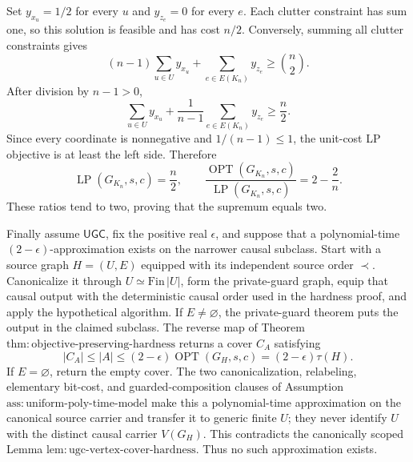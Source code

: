 Set \(y_{x_u}=1/2\) for every \(u\) and \(y_{z_e}=0\) for every \(e\).
Each clutter constraint has sum one, so this solution is feasible and has
cost \(n/2\).  Conversely, summing all clutter constraints gives
\[
 (n-1)\sum_{u\in U}y_{x_u}+\sum_{e\in E(K_n)}y_{z_e}
 \geq\binom n2.
\]
After division by \(n-1>0\),
\[
 \sum_{u\in U}y_{x_u}
 +\frac1{n-1}\sum_{e\in E(K_n)}y_{z_e}\geq\frac n2.
\]
Since every coordinate is nonnegative and \(1/(n-1)\leq1\), the unit-cost
LP objective is at least the left side.  Therefore
\[
 \operatorname{LP}(G_{K_n},s,c)=\frac n2,
 \qquad
 \frac{\operatorname{OPT}(G_{K_n},s,c)}
      {\operatorname{LP}(G_{K_n},s,c)}
 =2-\frac2n.
\]
These ratios tend to two, proving that the supremum equals two.

Finally assume \(\mathsf{UGC}\), fix the positive real
\(\epsilon\), and suppose that a polynomial-time
\((2-\epsilon)\)-approximation exists on the narrower causal subclass.
Start with a source graph \(H=(U,E)\) equipped with its independent source
order \(\prec\).  Canonicalize it through
\(U\simeq\mathrm{Fin}\,|U|\), form the private-guard graph, equip that
causal output with the deterministic causal order used in the hardness
proof, and apply the hypothetical algorithm.  If \(E\neq\varnothing\),
the private-guard theorem puts the output in the claimed subclass.  The
reverse map of Theorem
\(\mathrm{thm{:}objective\mbox{-}preserving\mbox{-}hardness}\) returns a
cover \(C_A\) satisfying
\[
 |C_A|\leq|A|
 \leq(2-\epsilon)\operatorname{OPT}(G_H,s,c)
 =(2-\epsilon)\tau(H).
\]
If \(E=\varnothing\), return the empty cover.  The two canonicalization,
relabeling, elementary bit-cost, and guarded-composition clauses of
Assumption \(\mathrm{ass{:}uniform\mbox{-}poly\mbox{-}time\mbox{-}model}\)
make this a polynomial-time approximation on the canonical source carrier
and transfer it to generic finite \(U\); they never identify \(U\) with the
distinct causal carrier \(V(G_H)\).  This contradicts the canonically scoped
Lemma \(\mathrm{lem{:}ugc\mbox{-}vertex\mbox{-}cover\mbox{-}hardness}\).
Thus no such approximation exists.
